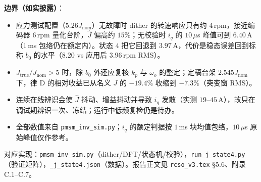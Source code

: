 \documentclass[11pt,a4paper]{article}
\newcommand{\Jnom}{J_{\mathrm{nom}}}
\newcommand{\Jtrue}{J_{\mathrm{true}}}
\newcommand{\Jhat}{\hat J}
\begin{document}
\textbf{边界（如实披露）}：
\begin{itemize}
  \item 应力测试配置（$5.26\Jnom$）无故障时 dither 的转速响应只有约 $4$\,rpm，接近编码器 $6$\,rpm 量化台阶，$\Jhat$ 偏高约 $15\%$；无校验时 $i_q$ 的 $10$\,$\mu$s 峰值可到 $6.40$\,A（$1$\,ms 包络仍在额定内）。状态 $4$ 把它回退到 $3.97$\,A，代价是稳态误差回到标称 $b_0$ 的水平（$8.20$ vs 应用后 $3.96$\,rpm RMS）。
  \item $\Jtrue/\Jnom>5$ 时，除 $b_0$ 外还应复核 $k_p$ 与 $\omega_o$ 的整定；定稿台架 $2.545\Jnom$ 下，律 D 的相对收益已从名义 $J$ 的 $-19.4\%$ 收缩到 $-7.3\%$（突变窗 RMS）。
  \item 连续在线辨识会使 $\Jhat$ 抖动、增益抖动并导致 $i_q$ 发散（实测 $19$--$45$\,A），故只在调试期辨识一次、冻结；运行中低频复检仍是待办。
  \item 全部数值来自 \texttt{pmsm\_inv\_sim.py}；$i_q$ 的额定判据按 $1$\,ms 块均值包络，$10$\,$\mu$s 原始峰值仅作参考。
\end{itemize}

\vspace{2mm}
\noindent\footnotesize 对应实现：\texttt{pmsm\_inv\_sim.py}（dither/DFT/状态机/校验），\texttt{run\_j\_state4.py}（验证矩阵），\texttt{\_j\_state4.json}（数据）。报告正文见 \texttt{rcso\_v3.tex} §5.6、附录 C.1--C.7。
\end{document}
